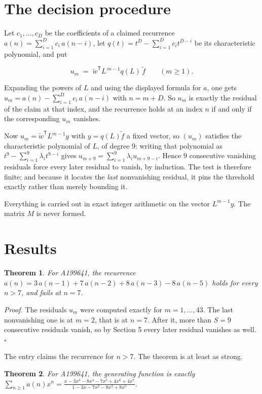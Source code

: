 \documentclass[11pt]{article}
\newtheorem{theorem}{Theorem}
\theoremstyle{definition}
\begin{document}
\section{The decision procedure}

Let $c_1,\dots,c_D$ be the coefficients of a claimed recurrence $a(n) = \sum_{i=1}^{D} c_i\,a(n-i)$, let $q(t) = t^{D} - \sum_{i=1}^{D} c_i t^{D-i}$ be its characteristic polynomial, and put

\[u_m \;=\; \tilde w^{\mathsf T} L^{\,m-1} q(L)\,\tilde f \qquad (m \ge 1).\]

Expanding the powers of $L$ and using the displayed formula for $a$, one gets $u_m = a(n) - \sum_{i=1}^{D} c_i\,a(n-i)$ with $n = m + D$. So $u_m$ is exactly the residual of the claim at that index, and the recurrence holds at an index $n$ if and only if the corresponding $u_m$ vanishes.

Now $u_m = \tilde w^{\mathsf T} L^{m-1} y$ with $y = q(L)\tilde f$ a fixed vector, so $(u_m)$ satisfies the characteristic polynomial of $L$, of degree $9$: writing that polynomial as $t^{9} - \sum_{i=1}^{9} \lambda_i t^{9-i}$ gives $u_{m+9} = \sum_{i=1}^{9} \lambda_i u_{m+9-i}$. Hence $9$ consecutive vanishing residuals force every later residual to vanish, by induction. The test is therefore finite; and because it locates the {\itshape last} nonvanishing residual, it pins the threshold exactly rather than merely bounding it.

Everything is carried out in exact integer arithmetic on the vector $L^{m-1}y$. The matrix $M$ is never formed.

\section{Results}

\begin{theorem} For A199641, the recurrence $a(n) = 3\,a(n-1) + 7\,a(n-2) + 8\,a(n-3) - 8\,a(n-5)$ holds for every $n > 7$, and fails at $n = 7$.\end{theorem}

{\itshape Proof.} The residuals $u_m$ were computed exactly for $m = 1,\dots,43$. The last nonvanishing one is at $m = 2$, that is at $n = 7$. After it, more than $S = 9$ consecutive residuals vanish, so by Section 5 every later residual vanishes as well. $\square$

The entry claims the recurrence for $n > 7$. The theorem is at least as strong.

\begin{theorem} For A199641, the generating function is exactly $\sum_{n\ge 1} a(n)x^n = \frac{x - 3x^{3} - 8x^{4} - 7x^{5} + 4x^{6} + 4x^{7}}{1 - 3x - 7x^{2} - 8x^{3} + 8x^{5}}$.\end{theorem}
\end{document}

